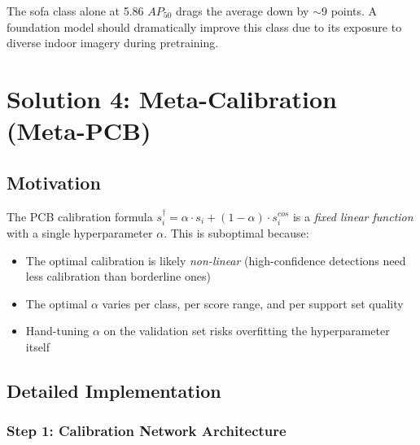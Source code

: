 \documentclass[11pt,a4paper]{article}
\begin{document}
The sofa class alone at 5.86 $AP_{50}$ drags the average down by $\sim$9 points. A foundation model should dramatically improve this class due to its exposure to diverse indoor imagery during pretraining.


\section{Solution 4: Meta-Calibration (Meta-PCB)}
\label{sec:metapcb}

\subsection{Motivation}

The PCB calibration formula $s_i^\dagger = \alpha \cdot s_i + (1-\alpha) \cdot s_i^{cos}$ is a \textit{fixed linear function} with a single hyperparameter $\alpha$. This is suboptimal because:
\begin{itemize}[nosep]
    \item The optimal calibration is likely \textit{non-linear} (high-confidence detections need less calibration than borderline ones)
    \item The optimal $\alpha$ varies per class, per score range, and per support set quality
    \item Hand-tuning $\alpha$ on the validation set risks overfitting the hyperparameter itself
\end{itemize}

\subsection{Detailed Implementation}

\subsubsection{Step 1: Calibration Network Architecture}
\end{document}
